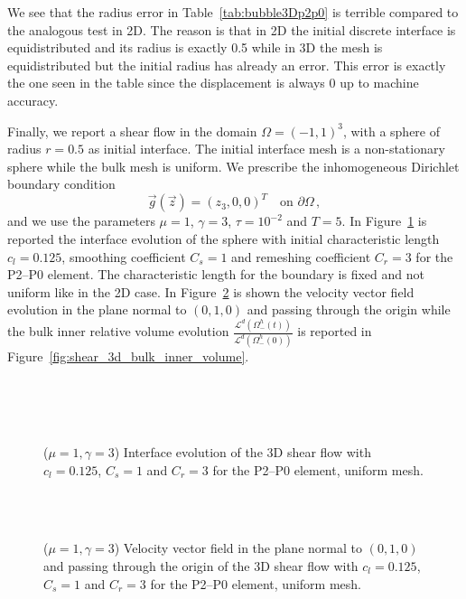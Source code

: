 \documentclass[a4paper,12pt,onecolumn]{article}
\begin{document}
We see that the radius error in Table~\ref{tab:bubble3Dp2p0} is terrible
compared to the analogous test in 2D. The reason is that in 2D the initial
discrete interface is equidistributed and its radius is exactly 0.5 while in 3D
the mesh is equidistributed but the initial radius has already an error. This
error is exactly the one seen in the table since the displacement is always 0 up
to machine accuracy.

Finally, we report a shear flow in the domain $\Omega=(-1,1)^3$, with a sphere
of radius $r=0.5$ as initial interface. The initial interface mesh is a
non-stationary sphere while the bulk mesh is uniform. We prescribe the
inhomogeneous Dirichlet boundary condition
\begin{equation*}
\vec g(\vec z)=(z_3,0,0)^T\quad \mbox{on }\partial\Omega\,,
\end{equation*}
and we use the parameters $\mu=1$, $\gamma=3$, $\tau=10^{-2}$ and $T=5$. In
Figure~\ref{fig:shear_3d} is reported the interface evolution of the sphere with
initial characteristic length $c_l=0.125$, smoothing coefficient $C_s=1$ and
remeshing coefficient $C_r=3$ for the P2--P0 element. The characteristic length
for the boundary is fixed and not uniform like in the 2D case. In
Figure~\ref{fig:shear_3d_velocity} is shown the velocity vector field evolution
in the plane normal to $(0,1,0)$ and passing through the origin while the bulk
inner relative volume evolution
$\frac{\mathcal{L}^d(\Omega^h_-(t))}{\mathcal{L}^d(\Omega^h_-(0))}$ is reported
in Figure~\ref{fig:shear_3d_bulk_inner_volume}.
\begin{figure}[htbp]
  \centering
  \\
  \quad
  \\
  \quad
  \\
  \caption{($\mu=1,\gamma=3$) Interface evolution of the 3D shear flow with
$c_l=0.125$, $C_s=1$ and $C_r=3$ for the P2--P0 element, uniform mesh.}
  \label{fig:shear_3d}
\end{figure}

\begin{figure}[htbp]
  \centering
  \quad
  \\
  \quad
  \\
  \caption{($\mu=1,\gamma=3$) Velocity vector field in the plane normal to
$(0,1,0)$ and passing through the origin of the 3D shear flow with $c_l=0.125$,
$C_s=1$ and $C_r=3$ for the P2--P0 element, uniform mesh.}
  \label{fig:shear_3d_velocity}
\end{figure}
\end{document}
